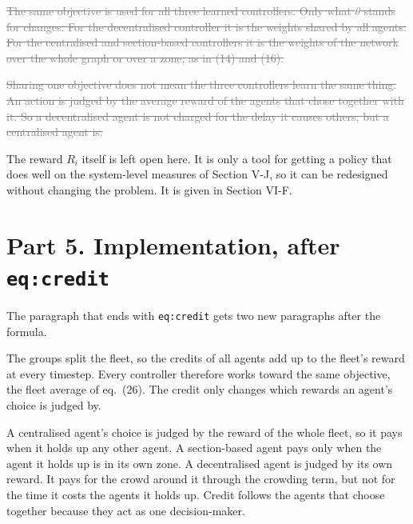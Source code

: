 \documentclass[11pt,a4paper]{article}
\newcommand{\old}[1]{\textcolor{gray}{\sout{#1}}}
\newenvironment{greenblock}{\color{newc}}{}
\begin{document}
\old{The same objective is used for all three learned controllers. Only what
$\theta$ stands for changes. For the decentralised controller it is the
weights shared by all agents. For the centralised and section-based
controllers it is the weights of the network over the whole graph or over a
zone, as in (14) and (16).}

\old{Sharing one objective does not mean the three controllers learn the same
thing. An action is judged by the average reward of the agents that chose
together with it. So a decentralised agent is not charged for the delay it
causes others, but a centralised agent is.}

The reward $R_i$ itself is left open here. It is only a tool for getting a
policy that does well on the system-level measures of Section V-J, so it can
be redesigned without changing the problem. It is given in Section VI-F.

\section*{Part 5. Implementation, after \texttt{eq:credit}}

The paragraph that ends with \texttt{eq:credit} gets two new paragraphs after
the formula.

\begin{greenblock}
The groups split the fleet, so the credits of all agents add up to the
fleet's reward at every timestep. Every controller therefore works toward the
same objective, the fleet average of eq.~(26). The credit only changes which
rewards an agent's choice is judged by.

A centralised agent's choice is judged by the reward of the whole fleet, so
it pays when it holds up any other agent. A section-based agent pays only
when the agent it holds up is in its own zone. A decentralised agent is
judged by its own reward. It pays for the crowd around it through the
crowding term, but not for the time it costs the agents it holds up. Credit
follows the agents that choose together because they act as one
decision-maker.
\end{greenblock}
\end{document}
